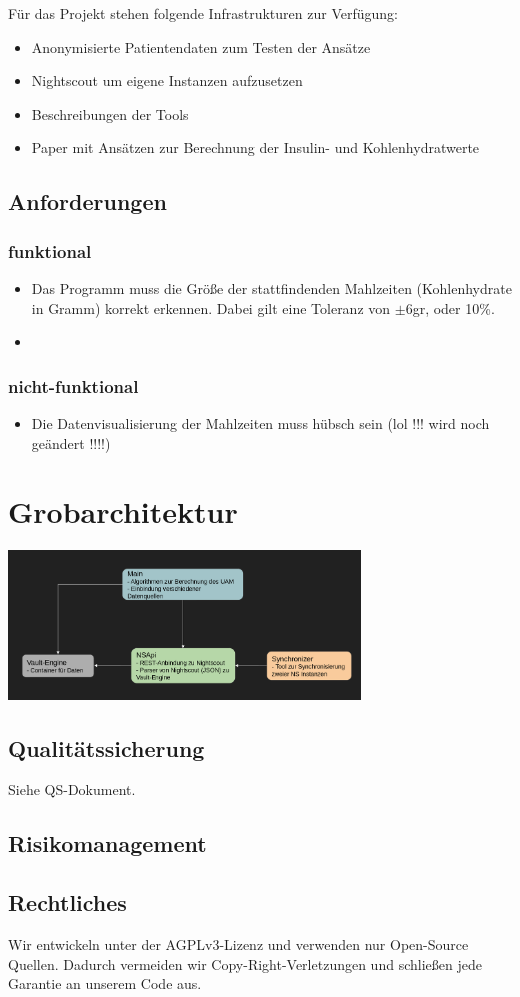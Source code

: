 \documentclass[accentcolor=tud0b,12pt,paper=a4]{tudreport}
\begin{document}
Für das Projekt stehen folgende Infrastrukturen zur Verfügung: 
\begin{itemize}
	\item Anonymisierte Patientendaten zum Testen der Ansätze
	\item Nightscout um eigene Instanzen aufzusetzen 
	\item Beschreibungen der Tools
	\item Paper mit Ansätzen zur Berechnung der Insulin- und Kohlenhydratwerte
\end{itemize}
		
	\section{Anforderungen}
	\subsection{funktional}
\begin{itemize}
	\item Das Programm muss die Größe der stattfindenden Mahlzeiten (Kohlenhydrate in Gramm) korrekt erkennen. Dabei gilt eine Toleranz von $\pm$6gr, oder 10\%.
	\item  
\end{itemize}
	
	\subsection{nicht-funktional}
\begin{itemize}
	\item Die Datenvisualisierung der Mahlzeiten muss hübsch sein  (lol !!! wird noch geändert !!!!)
\end{itemize}
	
	\chapter{Grobarchitektur}
	
	\centering
\includegraphics[width=0.7\textwidth]{architektur.png}
	
	\section{Qualitätssicherung}
	Siehe QS-Dokument.
	
	\section{Risikomanagement}
	
	\section{Rechtliches}
	
	Wir entwickeln unter der AGPLv3-Lizenz und verwenden nur Open-Source Quellen. Dadurch vermeiden wir Copy-Right-Verletzungen und schließen jede Garantie an unserem Code aus.
	
\end{document}
